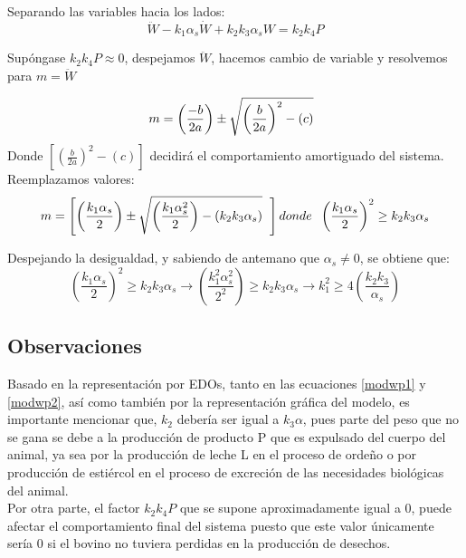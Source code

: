 Separando las variables hacia los lados:
\begin{equation}
    \ddot{W}- k_{1}\alpha_{s}\dot{W} + k_{2}k_{3}\alpha_{s}W = k_{2}k_{4}P
\end{equation}

Supóngase  $k_{2}k_{4}P\approx 0$, despejamos $\ddot{W}$, hacemos cambio de variable y resolvemos para $m = \ddot{W}$

\begin{equation}
    m=\left(\frac{-b}{2a}\right) \pm \sqrt{\left(\frac{b}{2a}\right)^{2}-(c)} \hspace{0.2cm}
\end{equation}
Donde $\left[\left(\frac{b}{2a}\right)^{2} - (c)\right]$ decidirá el comportamiento amortiguado del sistema. Reemplazamos valores:
\begin{equation}
    m=\left[\left(\frac{k_{1}\alpha_{s}}{2}\right)\pm\sqrt{\left(\frac{k_{1}\alpha_{s}^{2}}{2}\right)-(k_{2}k_{3}\alpha_{s})} \hspace{0.2cm}\right] donde \hspace{0.2cm} \left(\frac{k_{1}\alpha_{s}}{2}\right)^{2}\geq k_{2}k_{3}\alpha_{s}
\end{equation}

Despejando la desigualdad, y sabiendo de antemano que
 $\alpha_{s}\neq 0$, se obtiene que:
\begin{equation} \label{relacionkis}
    \left(\frac{k_{1}\alpha_{s}}{2}\right)^{2}\geq k_{2}k_{3}\alpha_{s} \longrightarrow \left(\frac{k_{1}^{2}\alpha_{s}^{2}}{2^{2}}\right)\geq k_{2}k_{3}\alpha_{s} \longrightarrow k_{1}^{2}\geq 4\left(\frac{k_{2}k_{3}}{\alpha_{s}}\right)
\end{equation}
\subsection{Observaciones}
Basado en la representación por EDOs, tanto en las ecuaciones \ref{modwp1} y \ref{modwp2}, así como también por la representación gráfica del modelo, es importante mencionar que, $k_{2}$ debería ser igual a $k_{3}\alpha$, pues parte del peso que no se gana se debe a la producción de producto P que es expulsado del cuerpo del animal, ya sea por la producción de leche L en el proceso de ordeño o por producción de estiércol en el proceso de excreción de las necesidades biológicas del animal. \\

Por otra parte, el factor $k_{2}k_{4}P$ que se supone aproximadamente igual a 0, puede afectar el comportamiento final del sistema puesto que este valor únicamente sería 0 si el bovino no tuviera perdidas en la producción de desechos.
